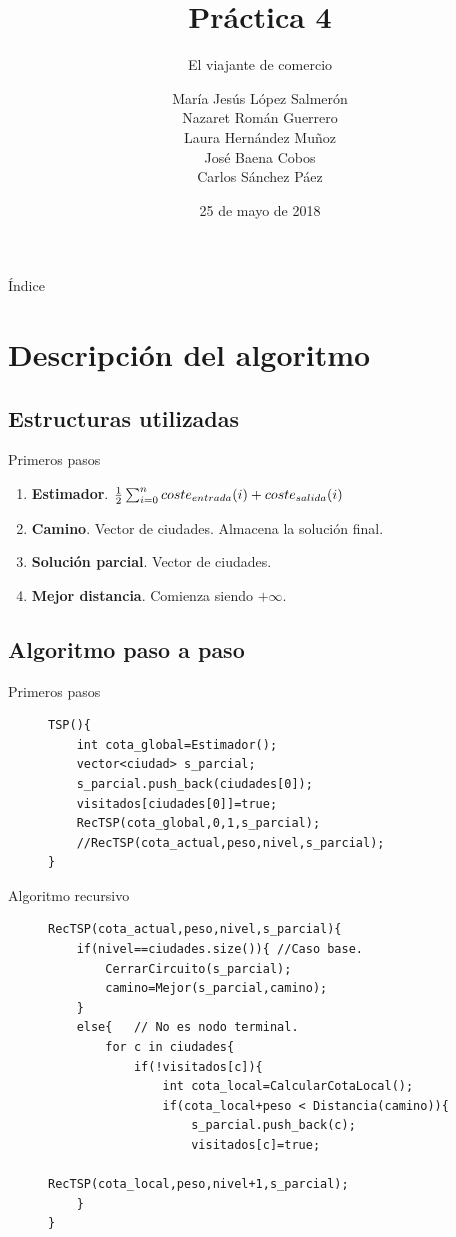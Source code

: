 \documentclass{beamer}
\title{Práctica 4}
\date{25 de mayo de 2018}
\subtitle{El viajante de comercio}
\author{María Jesús López Salmerón \\ Nazaret Román Guerrero \\ Laura Hernández Muñoz \\ José Baena Cobos  \\ Carlos Sánchez Páez}
\begin{document}
\centering
\begin{frame}
  \titlepage
\end{frame}

\begin{frame}{Índice}
  \tableofcontents
\end{frame}

\section{Descripción del algoritmo}

\subsection{Estructuras utilizadas}
\begin{frame}[fragile]{Primeros pasos}
\begin{enumerate}
	\item<+-> \textbf{Estimador}.
	$\centering \frac{1}{2} \sum_{i=0}^{n}coste_{entrada}(i)+coste_{salida}(i)$
	\item<+-> \textbf{Camino}. Vector de ciudades. Almacena la solución final.
	\item<+-> \textbf{Solución parcial}. Vector de ciudades.
	\item<+-> \textbf{Mejor distancia}. Comienza siendo $+\infty$.
\end{enumerate}
\end{frame}
\subsection{Algoritmo paso a paso}

\begin{frame}[fragile]{Primeros pasos}
\begin{figure}[H]
\centering
\begin{verbatim}
TSP(){
	int cota_global=Estimador();
	vector<ciudad> s_parcial;
	s_parcial.push_back(ciudades[0]);
	visitados[ciudades[0]]=true;
	RecTSP(cota_global,0,1,s_parcial);
	//RecTSP(cota_actual,peso,nivel,s_parcial);
}
\end{verbatim}
\end{figure}
\end{frame}


\begin{frame}[fragile]{Algoritmo recursivo}
\begin{figure}[H]
\centering
\begin{verbatim}
RecTSP(cota_actual,peso,nivel,s_parcial){
	if(nivel==ciudades.size()){ //Caso base.
		CerrarCircuito(s_parcial);
		camino=Mejor(s_parcial,camino);
	}
	else{	// No es nodo terminal.
		for c in ciudades{
			if(!visitados[c]){
				int cota_local=CalcularCotaLocal();
				if(cota_local+peso < Distancia(camino)){
					s_parcial.push_back(c);
					visitados[c]=true;
					RecTSP(cota_local,peso,nivel+1,s_parcial);
	}
}
\end{verbatim}
\end{figure}
\end{frame}
\end{document}
